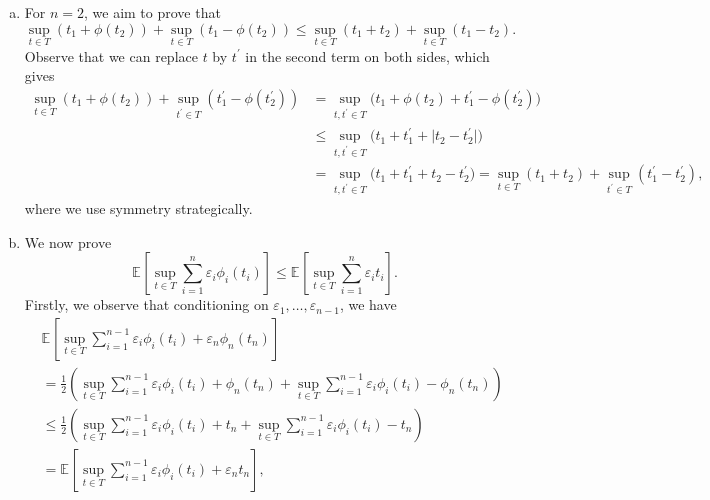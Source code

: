 \begin{answer}
	\begin{enumerate}[(a)]
		\item For \(n = 2\), we aim to prove that
		      \[
			      \sup _{t \in T} (t_1 + \phi (t_2)) + \sup _{t \in T} (t_1 - \phi (t_2))
			      \leq \sup _{t \in T} (t_1 + t_2) + \sup _{t \in T} (t_1 - t_2) .
		      \]
		      Observe that we can replace \(t\) by \(t^{\prime} \) in the second term on both sides, which gives
		      \[
			      \begin{split}
				      \sup _{t \in T} (t_1 + \phi (t_2)) + \sup _{t^{\prime} \in T} (t^{\prime} _1 - \phi (t^{\prime} _2))
				       & = \sup _{t, t^{\prime} \in T} \big(t_1 + \phi (t_2) + t^{\prime} _1 - \phi (t^{\prime} _2) \big)    \\
				       & \leq \sup _{t, t^{\prime} \in T} \big(t_1 + t^{\prime} _1 + \lvert t_2 - t^{\prime} _2 \rvert \big) \\
				       & = \sup _{t, t^{\prime} \in T} \big(t_1 + t^{\prime} _1 + t_2 - t^{\prime} _2 \big)
				      = \sup _{t \in T} (t_1 + t_2) + \sup _{t^{\prime} \in T} (t^{\prime} _1 - t^{\prime} _2) ,
			      \end{split}
		      \]
		      where we use symmetry strategically.
		\item We now prove
		      \[
			      \mathbb{E}_{}\left[\sup _{t \in T} \sum_{i=1}^{n} \varepsilon _i \phi _i(t_i) \right]
			      \leq \mathbb{E}_{}\left[\sup _{t \in T} \sum_{i=1}^{n} \varepsilon _i t_i \right].
		      \]
		      Firstly, we observe that conditioning on \(\varepsilon _1, \dots , \varepsilon _{n-1}\), we have
		      \[
			      \begin{split}
				       & \mathbb{E}_{}\left[\sup _{t \in T} \sum_{i=1}^{n-1} \varepsilon _i \phi _i(t_i) + \varepsilon _n \phi _n(t_n)\right]                                                                   \\
				       & = \frac{1}{2} \left( \sup _{t \in T} \sum_{i=1}^{n-1} \varepsilon _i \phi _i(t_i) + \phi _n(t_n) + \sup _{t \in T} \sum_{i=1}^{n-1} \varepsilon _i \phi _i(t_i) - \phi _n(t_n) \right) \\
				       & \leq \frac{1}{2} \left( \sup _{t \in T} \sum_{i=1}^{n-1} \varepsilon _i \phi _i(t_i) + t_n + \sup _{t \in T} \sum_{i=1}^{n-1} \varepsilon _i \phi _i(t_i) - t_n \right)                \\
				       & = \mathbb{E}_{}\left[\sup _{t \in T} \sum_{i=1}^{n-1} \varepsilon _i \phi _i(t_i) + \varepsilon _n t_n\right],
			      \end{split}
\]
\end{enumerate}
\end{answer}
